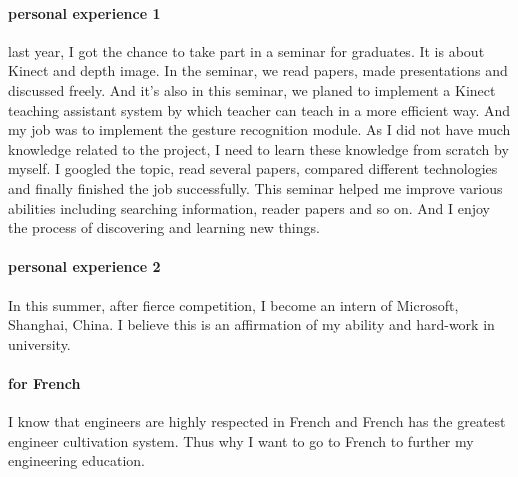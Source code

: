 \documentclass{article}
\begin{document}
\paragraph{personal experience 1}
last year, I got the chance to take part in a seminar for graduates. It is about Kinect and depth image. In the seminar, we read papers, made presentations and discussed freely. And it's also in this seminar, we planed to implement a Kinect teaching assistant system by which teacher can teach in a more efficient way. And my job was to implement the gesture recognition module. As I did not have much knowledge related to the project, I need to learn these knowledge from scratch by myself. I googled the topic, read several papers, compared different technologies and finally finished the job successfully. This seminar helped me improve various abilities including searching information, reader papers and so on. And I enjoy the process of discovering and learning new things.   
\paragraph{personal experience 2}
In this summer, after fierce competition, I become an intern of Microsoft, Shanghai, China. I believe this is an affirmation of my ability and hard-work in university.  
\paragraph{for French}
I know that engineers are highly respected in French and French has the greatest engineer cultivation system. Thus why I want to go to French to further my engineering education.
\end{document}
